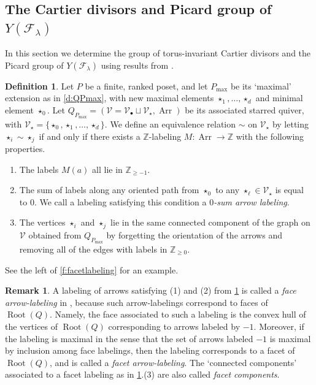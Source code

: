 \documentclass{amsart}
\theoremstyle{definition}
\newtheorem{defn}[thm]{Definition}
\newtheorem{remark}[thm]{Remark}
\numberwithin{equation}{section}
\newcommand{\V}{\mathcal{V}}
\newcommand{\Arr}{\operatorname{Arr}}
\newcommand{\FF}{\mathcal{F}}
\newcommand{\Root}{\operatorname{Root}}
\newcommand{\Z}{\mathbb{Z}}
\begin{document}
\subsection{The Cartier divisors and Picard group of 
$Y(\FF_\lambda)$}\label{sec:Cartier}

In this section we determine the group of torus-invariant Cartier divisors and the Picard group of  
$Y(\FF_\lambda)$
using 
results from \cite{RWReflexive}. 


\begin{defn} \label{d:equivalence}
Let $P$ be a finite, ranked poset, and let $P_{\max}$ be its `maximal' extension 
as in \cref{d:QPmax}, 
with new maximal elements $\star_1,\dotsc,\star_d$ and minimal element $\star_0$. 
Let $Q_{P_{\max}}=(\V=\V_\bullet\sqcup\V_\star,\Arr)$ be its associated starred quiver, with 
	$\V_\star=\{\star_0,\star_1,\dotsc,\star_d\}$. 
We define an equivalence relation $\sim$ on $\V_\star$ by letting $\star_i\sim \star_j$  if and only if there exists a $\Z$-labeling  $M:\Arr\to\Z$ with the following properties.
\begin{enumerate}
\item The labels $M(a)$ all lie in $\Z_{\ge -1}$. 
\item The sum of labels along any oriented path from $\star_0$ to 
	any $\star_\ell \in \V_\star$ is equal to $0$. We call a labeling satisfying this condition a \textit{$0$-sum arrow labeling}.
\item 
	The vertices $\star_i$ and $\star_j$ lie in the same connected component of 
		the graph on $\V$ obtained from $Q_{P_{\max}}$ by forgetting the orientation of the arrows and removing all of the edges with labels in $\Z_{\ge 0}$.
\end{enumerate}
 See the left of \cref{f:facetlabeling} for an example.  
\end{defn}

\begin{remark}\label{r:facetlabeling}  A labeling of arrows satisfying   (1) and (2) from \cref{d:equivalence} is called a \textit{face arrow-labeling} in \cite{RWReflexive}, because such arrow-labelings 
	correspond to faces of $\Root(Q)$. Namely, the face associated to such a labeling is the convex hull of the vertices of $\Root(Q)$ corresponding to arrows labeled by $-1$. Moreover, if the labeling is maximal in the sense that the set of arrows labeled $-1$ is maximal by inclusion among face labelings, then the labeling corresponds to a facet of $\Root(Q)$, and is called a \textit{facet arrow-labeling}. The `connected components' associated to a facet labeling as in  \cref{d:equivalence}.(3) are also called \emph{facet components}.
\end{remark}
\end{document}
